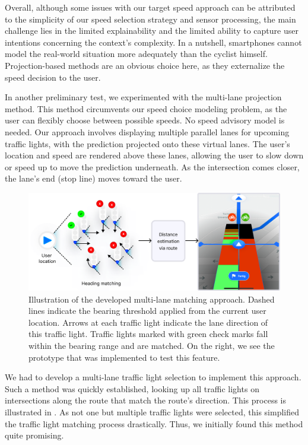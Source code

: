 Overall, although some issues with our target speed approach can be attributed to the simplicity of our speed selection strategy and sensor processing, the main challenge lies in the limited explainability and the limited ability to capture user intentions concerning the context's complexity. In a nutshell, smartphones cannot model the real-world situation more adequately than the cyclist himself. Projection-based methods are an obvious choice here, as they externalize the speed decision to the user.

In another preliminary test, we experimented with the multi-lane projection method. This method circumvents our speed choice modeling problem, as the user can flexibly choose between possible speeds. No speed advisory model is needed. Our approach involves displaying multiple parallel lanes for upcoming traffic lights, with the prediction projected onto these virtual lanes. The user's location and speed are rendered above these lanes, allowing the user to slow down or speed up to move the prediction underneath. As the intersection comes closer, the lane's end (stop line) moves toward the user. 

\begin{figure}[t]
\centering
\includegraphics[width=\linewidth]{images/multi-lane-view.png}
\caption{Illustration of the developed multi-lane matching approach. Dashed lines indicate the bearing threshold applied from the current user location. Arrows at each traffic light indicate the lane direction of this traffic light. Traffic lights marked with green check marks fall within the bearing range and are matched. On the right, we see the prototype that was implemented to test this feature.}
\label{fig:multi-lane-view}
\end{figure}

We had to develop a multi-lane traffic light selection to implement this approach. Such a method was quickly established, looking up all traffic lights on intersections along the route that match the route's direction. This process is illustrated in . As not one but multiple traffic lights were selected, this simplified the traffic light matching process drastically. Thus, we initially found this method quite promising.

